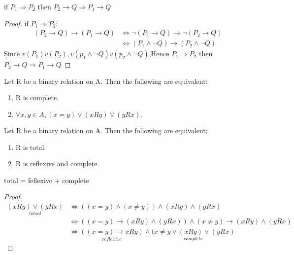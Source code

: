 \documentclass[cn,10pt,math=newtx,citestyle=gb7714-2015,bibstyle=gb7714-2015]{elegantbook}
\begin{document}
\begin{proposition}
    if $P_1\Rightarrow P_2$ then $P_2\rightarrow Q \Rightarrow P_1\rightarrow Q$
\end{proposition}
\begin{proof}
    if $P_1\Rightarrow P_2$:
        \begin{align*}
            (P_2\rightarrow Q) \rightarrow (P_1 \rightarrow Q) &\Leftrightarrow \lnot(P_1\rightarrow Q)\rightarrow \lnot (P_2\rightarrow Q)\\
            &\Leftrightarrow(P_1\land \lnot Q)\rightarrow (P_2\land \lnot Q)
        \end{align*}
    Since $v(P_1)$\leq$ v(P_2),v(p_1\land \lnot Q)$\leq$v(p_2\land \lnot Q)$,Hence $P_1\Rightarrow P_2$ then $P_2\rightarrow Q \Rightarrow P_1\rightarrow Q$
\end{proof}

\begin{theorem}
    Let R be a binary relation on A. Then the
following are equivalent:
\begin{enumerate}
    \item R is complete.
    \item $\forall x,y\in A,(x=y)\lor (xRy)\lor (yRx).$
\end{enumerate}
\end{theorem}

\begin{theorem}
    Let R be a binary relation on A. Then the
following are equivalent:
\begin{enumerate}
    \item R is total.
    \item R is reflexive and complete.
\end{enumerate}
\end{theorem}
\begin{note}
    total = feflexive + complete
\end{note}
\begin{proof}
    \begin{align*}
        \underset{totoal}{(xRy)\lor (yRx)}&\Leftrightarrow((x=y)\land(x\neq y))\land (xRy)\land (yRx)\\
        &\Leftrightarrow((x=y)\rightarrow(xRy)\land(yRx))\land(x\neq y)\to (xRy)\land(yRx)\\
        &\Leftrightarrow \underset{reflexive}{((x=y)\to xRy)}\land \underset{complete}{(x\neq y \lor (xRy)\lor (yRx)}
    \end{align*}
\end{proof}
\newpage
\end{document}
